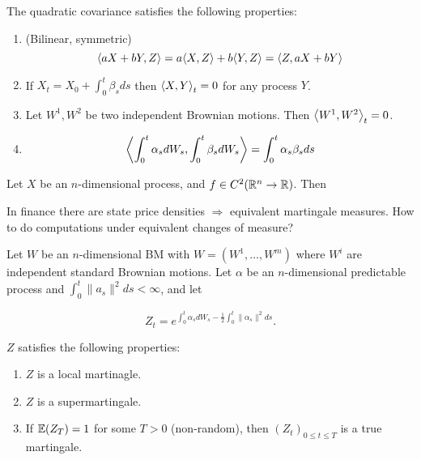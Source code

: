 \begin{proposition}
  The quadratic covariance satisfies the following properties:
  \begin{enumerate}
  \item (Bilinear, symmetric)
    \begin{equation}
      \label{eq:45}
      \IP{ aX + bY, Z } = a \IP{ X, Z } + b \IP {Y, Z} = \IP{ Z, aX + bY }
    \end{equation}
  \item If $X_{t} = X_{0} + \int_{0}^{t} \beta_{s} ds$ then $\IP{X,
      Y}_{t} = 0$ for any \ito process $Y$.
  \item Let $W^{1}, W^{2}$ be two independent Brownian motions.  Then
    $\IP{ W^{1}, W^{2} }_{t} = 0$.
  \item
    \begin{equation}
      \label{eq:46}
      \IP{\int_{0}^{t} \alpha_{s} dW_{s}, \int_{0}^{t} \beta_{s}
        dW_{s}} = 
      \int_{0}^{t} \alpha_{s} \beta_{s} ds
    \end{equation}
  \end{enumerate}
\end{proposition}

Let $X$ be an $n$-dimensional \ito process, and $f \in C^{2}(\mathbb{R}^{n}
\rightarrow \mathbb{R})$.  Then
\begin{equation}
  \label{eq:47}
\end{equation}


In finance there are state price densities $\Rightarrow$ equivalent
martingale measures.  How to do computations under equivalent changes
of measure?

Let $W$ be an $n$-dimensional BM with $W = (W^{1}, \dots, W^{m})$
where $W^{i}$ are independent standard Brownian motions.  Let $\alpha$
be an $n$-dimensional predictable process and $\int_{0}^{t} \| a_{s}
\|^{2} ds < \infty$, and let

\begin{equation}
  \label{eq:48}
  Z_{t} = e^{\int_{0}^{t} \alpha_{s}
    dW_{s} - \frac{1}{2} \int_{0}^{t} \| \alpha_{s} \|^{2} ds}.
\end{equation}

\begin{proposition}
  $Z$ satisfies the following properties:
  \begin{enumerate}
  \item $Z$ is a local martinagle.
  \item $Z$ is a supermartingale.
  \item If $\E{Z_{T}} = 1$ for some $T > 0$ (non-random), then
    $(Z_{t})_{0 \leq t \leq T}$ is a true martingale.
  \end{enumerate}
\end{proposition}

